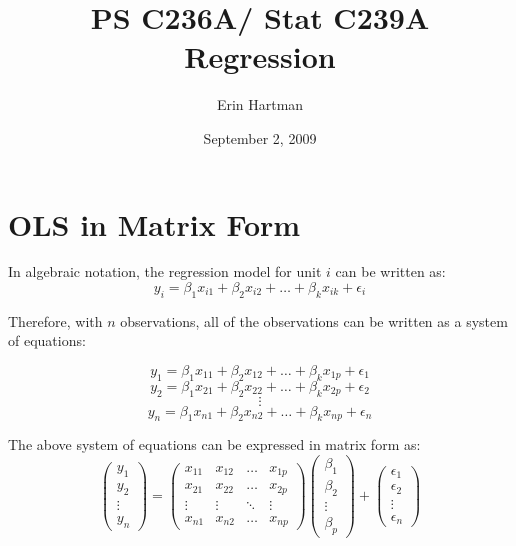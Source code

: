 \documentclass[12pt]{article}
\title{PS C236A/ Stat C239A \\ Regression}
\author{Erin Hartman}
\date{September 2, 2009}
\begin{document}
\maketitle



\section{OLS in Matrix Form}

In algebraic notation, the regression model for unit $i$ can be written as:
\[ y_{i} = \beta_{1}x_{i1} + \beta_{2}x_{i2} + \dots + \beta_{k}x_{ik} + \epsilon_{i} \]

Therefore, with $n$ observations, all of the observations can be written as a system of equations:

\[ y_{1} = \beta_{1}x_{11} + \beta_{2}x_{12} + \dots + \beta_{k}x_{1p} + \epsilon_{1} \]
\[ y_{2} = \beta_{1}x_{21} + \beta_{2}x_{22} + \dots + \beta_{k}x_{2p} + \epsilon_{2} \]
\[ \vdots \]
\[ y_{n} = \beta_{1}x_{n1} + \beta_{2}x_{n2} + \dots + \beta_{k}x_{np} + \epsilon_{n} \]

The above system of equations can be expressed in matrix form as:
\[ \left( \begin{array}{c} y_{1} \\  y_{2} \\   \vdots \\  y_{n}  \end{array} \right) =  
\left( \begin{array}{cccc}
x_{11} & x_{12} & \dots & x_{1p} \\
x_{21} & x_{22} & \dots & x_{2p} \\
\vdots & \vdots & \ddots & \vdots \\
x_{n1} & x_{n2} & \dots & x_{np}
\end{array} \right)  \left( \begin{array}{c} \beta_{1} \\  \beta_{2} \\   \vdots \\  \beta_{p}  \end{array} \right)   +  \left( \begin{array}{c} \epsilon_{1} \\  \epsilon_{2} \\   \vdots \\  \epsilon_{n}  \end{array} \right) \]
\end{document}
